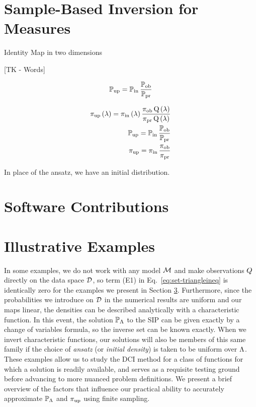 \pagebreak
\section{Sample-Based Inversion for Measures}\label{sec:ch02-sample}




Identity Map in two dimensions


[TK - Words]

\begin{equation}
\operatorname*{\mathbb{P}_{up}} = \operatorname*{\mathbb{P}_{in}} \frac{\operatorname*{\mathbb{P}_{ob}}}{\operatorname*{\mathbb{P}_{pr}}}
\end{equation}

\begin{equation}
\begin{split}
\operatorname*{\operatorname*{\pi_{up}}\left ( \lambda \right ) = \operatorname*{\pi_{in}}\left ( \lambda \right ) \frac{\operatorname*{\pi_{ob}}Q\left ( \lambda \right )}{\operatorname*{\pi_{pr}}Q\left ( \lambda \right )}}\\
\operatorname*{\operatorname*{\mathbb{P}_{up}} = \operatorname*{\mathbb{P}_{in}} \frac{\operatorname*{\mathbb{P}_{ob}}}{\operatorname*{\mathbb{P}_{pr}}}}\\
\operatorname*{\operatorname*{\pi_{up}} = \operatorname*{\pi_{in}} \frac{\operatorname*{\pi_{ob}}}{\operatorname*{\pi_{pr}}}}
\end{split}
\end{equation}

In place of the ansatz, we have an initial distribution.



\section{Software Contributions}\label{sec:ch02-software}



\section{Illustrative Examples}\label{sec:ch02-examples}
In some examples, we do not work with any model $\mathcal{M}$ and make observations $Q$ directly on the data space $\mathcal{D}$, so term (E1) in Eq.~\eqref{eq:set-triangleineq} is identically zero for the examples we present in Section \ref{sec:ch02-examples}.
Furthermore, since the probabilities we introduce on $\mathcal{D}$ in the numerical results are uniform and our maps linear, the densities can be described analytically with a characteristic function.
In this event, the solution $\operatorname*{\mathbb{P}_{{\Lambda}}}$ to the SIP can be given exactly by a change of variables formula, so the inverse set can be known exactly.
When we invert characteristic functions, our solutions will also be members of this same family if the choice of \emph{ansatz} (or \emph{initial density}) is taken to be uniform over ${\Lambda}$.
These examples allow us to study the DCI method for a class of functions for which a solution is readily available, and serves as a requisite testing ground before advancing to more nuanced problem definitions.
We present a brief overview of the factors that influence our practical ability to accurately approximate $\operatorname*{\mathbb{P}_{{\Lambda}}}$ and $\operatorname*{\pi_{up}}$ using finite sampling.

